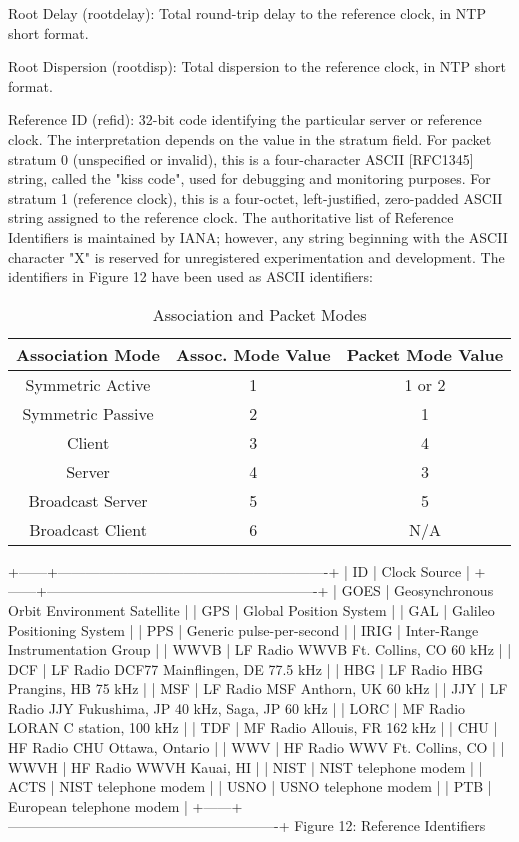 Root Delay (rootdelay): Total round-trip delay to the reference
clock, in NTP short format.

Root Dispersion (rootdisp): Total dispersion to the reference clock,
in NTP short format.

Reference ID (refid): 32-bit code identifying the particular server
or reference clock. The interpretation depends on the value in the
stratum field. For packet stratum 0 (unspecified or invalid), this
is a four-character ASCII [RFC1345] string, called the "kiss code",
used for debugging and monitoring purposes. For stratum 1 (reference
clock), this is a four-octet, left-justified, zero-padded ASCII
string assigned to the reference clock. The authoritative list of
Reference Identifiers is maintained by IANA; however, any string
beginning with the ASCII character "X" is reserved for unregistered
experimentation and development. The identifiers in Figure 12 have
been used as ASCII identifiers:

\begin{table}[htb]
\center
\begin{tabular}{c | c | c}
Association Mode & Assoc. Mode Value & Packet Mode Value \\
\hline
\hline
Symmetric Active & 1 & 1 or 2 \\
Symmetric Passive & 2 & 1 \\
Client & 3 & 4 \\
Server & 4 & 3 \\
Broadcast Server & 5 & 5 \\
Broadcast Client & 6 & N/A \\
\hline
\end{tabular}
\label{association_and_packet_modes}
\caption{Association and Packet Modes}
\end{table}

+------+----------------------------------------------------------+
| ID | Clock Source |
+------+----------------------------------------------------------+
| GOES | Geosynchronous Orbit Environment Satellite |
| GPS | Global Position System |
| GAL | Galileo Positioning System |
| PPS | Generic pulse-per-second |
| IRIG | Inter-Range Instrumentation Group |
| WWVB | LF Radio WWVB Ft. Collins, CO 60 kHz |
| DCF | LF Radio DCF77 Mainflingen, DE 77.5 kHz |
| HBG | LF Radio HBG Prangins, HB 75 kHz |
| MSF | LF Radio MSF Anthorn, UK 60 kHz |
| JJY | LF Radio JJY Fukushima, JP 40 kHz, Saga, JP 60 kHz |
| LORC | MF Radio LORAN C station, 100 kHz |
| TDF | MF Radio Allouis, FR 162 kHz |
| CHU | HF Radio CHU Ottawa, Ontario |
| WWV | HF Radio WWV Ft. Collins, CO |
| WWVH | HF Radio WWVH Kauai, HI |
| NIST | NIST telephone modem |
| ACTS | NIST telephone modem |
| USNO | USNO telephone modem |
| PTB | European telephone modem |
+------+----------------------------------------------------------+
Figure 12: Reference Identifiers

